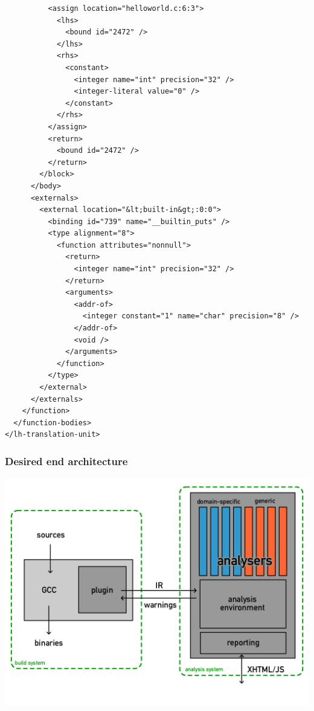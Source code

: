 \documentclass{beamer}
\begin{document}
\begin{frame}[fragile]
\tiny \begin{verbatim}
          <assign location="helloworld.c:6:3">
            <lhs>
              <bound id="2472" />
            </lhs>
            <rhs>
              <constant>
                <integer name="int" precision="32" />
                <integer-literal value="0" />
              </constant>
            </rhs>
          </assign>
          <return>
            <bound id="2472" />
          </return>
        </block>
      </body>
      <externals>
        <external location="&lt;built-in&gt;:0:0">
          <binding id="739" name="__builtin_puts" />
          <type alignment="8">
            <function attributes="nonnull">
              <return>
                <integer name="int" precision="32" />
              </return>
              <arguments>
                <addr-of>
                  <integer constant="1" name="char" precision="8" />
                </addr-of>
                <void />
              </arguments>
            </function>
          </type>
        </external>
      </externals>
    </function>
  </function-bodies>
</lh-translation-unit>
\end{verbatim}
\end{frame}

\frame
{
  \frametitle{Desired end architecture}

  \includegraphics[width=1.0\textwidth]{arch.png}
}
\end{document}

